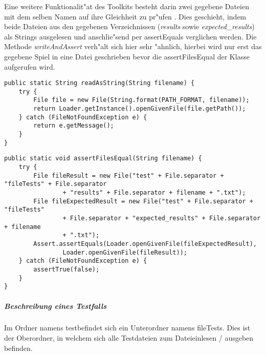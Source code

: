 Eine weitere Funktionalit"at des Toolkits besteht darin zwei gegebene Dateien mit dem selben Namen auf ihre Gleichheit zu pr"ufen . Dies geschieht, indem beide Dateien aus den gegebenen Verzeichnissen (\emph{results} sowie \emph{expected\_results}) als Strings ausgelesen und anschlie"send per assertEquals verglichen werden. Die Methode \emph{writeAndAssert} verh"alt sich hier sehr "ahnlich, hierbei wird nur erst das gegebene Spiel in eine Datei geschrieben bevor die assertFilesEqual der Klasse aufgerufen wird. 
\begin{lstlisting}[float,style=CodeHighlighting,caption=TestToolkit - readAsString,label=lst:testToolkit_readAsString]
public static String readAsString(String filename) {
    try {
        File file = new File(String.format(PATH_FORMAT, filename));
        return Loader.getInstance().openGivenFile(file.getPath());
    } catch (FileNotFoundException e) {
        return e.getMessage();
    }
}
\end{lstlisting}
\begin{lstlisting}[float,style=CodeHighlighting,caption=TestToolkit - assertFilesEqual,label=lst:testToolkit_assertFilesEqual]
public static void assertFilesEqual(String filename) {
    try {
        File fileResult = new File("test" + File.separator + "fileTests" + File.separator
                + "results" + File.separator + filename + ".txt");
        File fileExpectedResult = new File("test" + File.separator + "fileTests" 
        		+ File.separator + "expected_results" + File.separator + filename 
        		+ ".txt");
        Assert.assertEquals(Loader.openGivenFile(fileExpectedResult), 
        		Loader.openGivenFile(fileResult));
    } catch (FileNotFoundException e) {
        assertTrue(false);
    }
}
\end{lstlisting}

\subparagraph{Beschreibung eines Testfalls}
Im Ordner namens \glqq test\grqq befindet sich ein Unterordner namens \glqq fileTests\grqq . Dies ist der Oberordner, in welchem sich alle Testdateien zum Dateieinlesen / ausgeben befinden. 